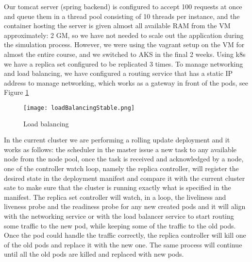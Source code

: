 Our tomcat server (spring backend) is configured to accept 100 requests at once and queue them in a thread pool consisting of 10 threads per instance, and the container hosting the server is given almost all available RAM from the VM approximately: 2 GM, so we have not needed to scale out the application during the simulation process. However, we were using the vagrant setup on the VM for almost the entire course, and we switched to AKS in the final 2 weeks. Using k8s we have a replica set configured to be replicated 3 times. To manage networking and load balancing, we have configured a routing service that has a static IP address to manage networking, which works as a gateway in front of the pods, see Figure \ref{fig:loadBalancingStable}

\begin{figure}[h]
    \centering
    \texttt{[image: loadBalancingStable.png]}
    \caption{Load balancing \cite{https://kubernetes.io/KubernetesKubernetes}}
    \label{fig:loadBalancingStable}
\end{figure}

In the current cluster we are performing a rolling update deployment and it works as follows: the scheduler in the master issue a new task to any available node from the node pool, once the task is received and acknowledged by a node, one of the controller watch loop, namely the replica controller, will register the desired state in the deployment manifest and compare it with the current cluster sate to make sure that the cluster is running exactly what is specified in the manifest. The replica set controller will watch, in a loop, the liveliness and liveness probe and the readiness probe for any new created pods and it will align with the networking service or with the load balancer service to start routing some traffic to the new pod, while keeping some of the traffic to the old pods. Once the pod could handle the traffic correctly, the replica controller will kill one of the old pods and replace it with the new one. The same process will continue until all the old pods are killed and replaced with new pods.

